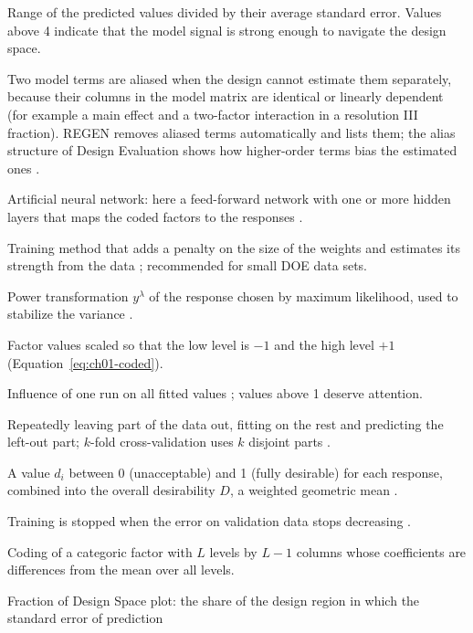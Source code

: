 \begin{description}[style=nextline,leftmargin=2em]
\item[Adequate precision] Range of the predicted values divided by their average standard error. Values above 4
  indicate that the model signal is strong enough to navigate the design space.
\item[Aliasing] Two model terms are aliased when the design cannot estimate them separately, because their columns
  in the model matrix are identical or linearly dependent (for example a main effect and a two-factor interaction
  in a resolution III fraction). REGEN removes aliased terms automatically and lists them; the alias structure of
  Design Evaluation shows how higher-order terms bias the estimated ones \citep{montgomery2017}.
\item[ANN] Artificial neural network: here a feed-forward network with one or more hidden layers that maps the
  coded factors to the responses \citep{hastie2009}.
\item[Bayesian regularization] Training method that adds a penalty on the size of the weights and estimates its
  strength from the data \citep{mackay1992,foresee1997}; recommended for small DOE data sets.
\item[Box-Cox transformation] Power transformation $y^\lambda$ of the response chosen by maximum likelihood, used to
  stabilize the variance \citep{boxcox1964}.
\item[Coded units] Factor values scaled so that the low level is $-1$ and the high level $+1$
  (Equation~\ref{eq:ch01-coded}).
\item[Cook's distance] Influence of one run on all fitted values \citep{cook1977}; values above 1 deserve
  attention.
\item[Cross-validation] Repeatedly leaving part of the data out, fitting on the rest and predicting the left-out
  part; $k$-fold cross-validation uses $k$ disjoint parts \citep{hastie2009}.
\item[Desirability] A value $d_i$ between 0 (unacceptable) and 1 (fully desirable) for each response, combined into
  the overall desirability $D$, a weighted geometric mean \citep{derringer1980}.
\item[Early stopping] Training is stopped when the error on validation data stops decreasing
  \citep{prechelt1998}.
\item[Effect coding] Coding of a categoric factor with $L$ levels by $L-1$ columns whose coefficients are
  differences from the mean over all levels.
\item[FDS] Fraction of Design Space plot: the share of the design region in which the standard error of prediction

\end{description}

